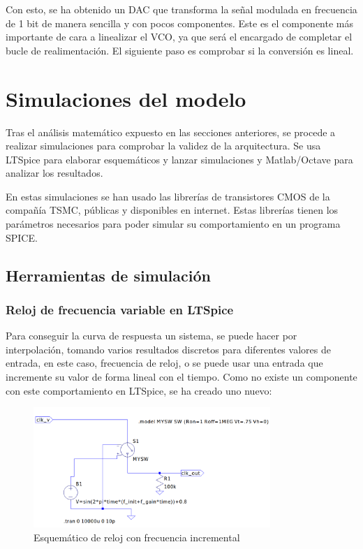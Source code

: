 \documentclass[12pt]{report} %
\begin{document}
	Con esto, se ha obtenido un DAC que transforma la señal modulada en frecuencia de 1 bit de manera sencilla y con pocos componentes. Este es el componente más importante de cara a linealizar el VCO, ya que será el encargado de completar el bucle de realimentación. El siguiente paso es comprobar si la conversión es lineal.
	
	\section{Simulaciones del modelo}
	
	Tras el análisis matemático expuesto en las secciones anteriores, se procede a realizar simulaciones para comprobar la validez de la arquitectura. Se usa LTSpice para elaborar esquemáticos y lanzar simulaciones y Matlab/Octave para analizar los resultados.
	
	En estas simulaciones se han usado las librerías de transistores CMOS de la compañía TSMC, públicas y disponibles en internet. Estas librerías tienen los parámetros necesarios para poder simular su comportamiento en un programa SPICE.
	
	\subsection{Herramientas de simulación}
	
	\subsubsection{Reloj de frecuencia variable en LTSpice}
	Para conseguir la curva de respuesta un sistema, se puede hacer por interpolación, tomando varios resultados discretos para diferentes valores de entrada, en este caso, frecuencia de reloj, o se puede usar una entrada que incremente su valor de forma lineal con el tiempo. Como no existe un componente con este comportamiento en LTSpice, se ha creado uno nuevo:
	
	\begin{figure}[H]
		\includegraphics[width=0.8\textwidth]{ltspice-clk-freq.png}
		\caption[Esquemático de reloj con frecuencia incremental]{Esquemático de reloj con frecuencia incremental}
		\label{fig:ltspice-clk-freq.png}
	\end{figure}
	
\end{document}
